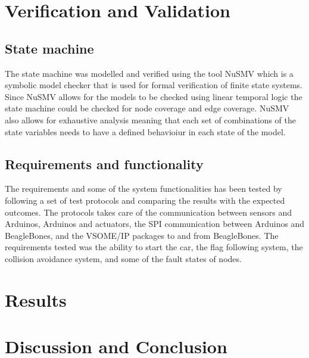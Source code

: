 \documentclass[11pt, titlepage]{article} %
\begin{document}
\clearpage
\section{Verification and Validation}

\subsection{State machine}
The state machine was modelled and verified using the tool NuSMV which is a symbolic model checker that is used for formal verification of finite state systems. Since NuSMV allows for the models to be checked using linear temporal logic the state machine could be checked for node coverage and edge coverage. NuSMV also allows for exhaustive analysis meaning that each set of combinations of the state variables needs to have a defined behavioiur in each state of the model.

\subsection{Requirements and functionality}
The requirements and some of the system functionalities has been tested by following a set of test protocols and comparing the results with the expected outcomes. The protocols takes care of the communication between sensors and Arduinos, Arduinos and actuators, the SPI communication between Arduinos and BeagleBones, and the VSOME/IP packages to and from BeagleBones. The requirements tested was the ability to start the car, the flag following system, the collision avoidance system, and some of the fault states of nodes.

\clearpage
\section{Results}

\clearpage
\section{Discussion and Conclusion}
\end{document}
